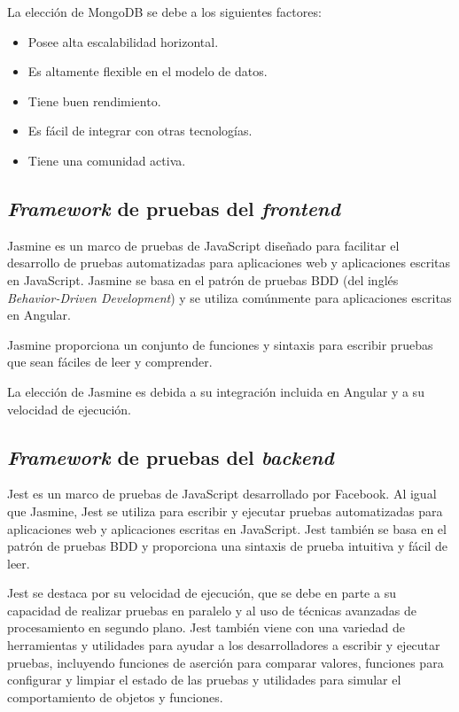 La elección de MongoDB se debe a los siguientes factores: 
\begin{itemize}
	\item Posee alta escalabilidad horizontal.
	\item Es altamente flexible en el modelo de datos.
	\item Tiene buen rendimiento.
	\item Es fácil de integrar con otras tecnologías.
	\item Tiene una comunidad activa.
\end{itemize}

\subsection{\emph{Framework} de pruebas del \emph{frontend}}

Jasmine \citep{WEBSITE:JASMINE} es un marco de pruebas de JavaScript diseñado para facilitar el desarrollo de pruebas automatizadas para aplicaciones web y aplicaciones escritas en JavaScript. Jasmine se basa en el patrón de pruebas BDD (del inglés \textit{Behavior-Driven Development}) \citep{WEBSITE:BDD} y se utiliza comúnmente para aplicaciones escritas en Angular.

Jasmine proporciona un conjunto de funciones y sintaxis para escribir pruebas que sean fáciles de leer y comprender.

La elección de Jasmine es debida a su integración incluida en Angular y a su velocidad de ejecución.

\subsection{\emph{Framework} de pruebas del \emph{backend}}

Jest \citep{WEBSITE:JESTJS} es un marco de pruebas de JavaScript desarrollado por Facebook. Al igual que Jasmine, Jest se utiliza para escribir y ejecutar pruebas automatizadas para aplicaciones web y aplicaciones escritas en JavaScript. Jest también se basa en el patrón de pruebas BDD y proporciona una sintaxis de prueba intuitiva y fácil de leer.

Jest se destaca por su velocidad de ejecución, que se debe en parte a su capacidad de realizar pruebas en paralelo y al uso de técnicas avanzadas de procesamiento en segundo plano. Jest también viene con una variedad de herramientas y utilidades para ayudar a los desarrolladores a escribir y ejecutar pruebas, incluyendo funciones de aserción para comparar valores, funciones  para configurar y limpiar el estado de las pruebas y utilidades para simular el comportamiento de objetos y funciones.

